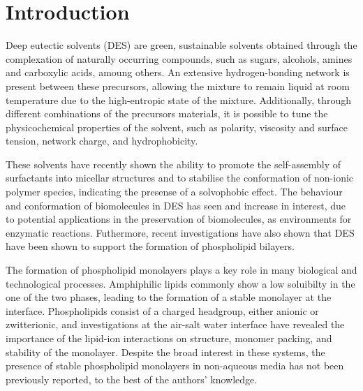 \documentclass[twoside,twocolumn,9pt]{article}
\begin{document}

\section{Introduction}
Deep eutectic solvents (DES) are green, sustainable solvents obtained through the complexation of naturally occurring compounds, such as sugars, alcohols, amines and carboxylic acids, amoung others.\cite{Smith2014, Dai2013} An extensive hydrogen-bonding network is present between these precursors, allowing the mixture to remain liquid at room temperature due to the high-entropic state of the mixture.\cite{Hammond2016, Hammond2017, Araujo2017} Additionally, through different combinations of the precursors materials, it is possible to tune the physicochemical properties of the solvent, such as polarity,\cite{Pandey2014} viscosity and surface tension,\cite{Smith2014} network charge,\cite{Zahn2016} and hydrophobicity.\cite{Ribeiro2015,vanOsch2015} 

These solvents have recently shown the ability to promote the self-assembly of surfactants into micellar structures\cite{Sanchez-Fernandez2016,Arnold2015} and to stabilise the conformation of non-ionic polymer species,\cite{Sapir2016} indicating the presense of a solvophobic effect. The behaviour and conformation of biomolecules in DES has seen and increase in interest,\cite{Esquembre2013,Gorke2010,Gorke2008,Monhami2014,Wu2014,Harifi-Mood2017,Milano2017,Sanchez-Fernandez2017} due to potential applications in the preservation of biomolecules, as environments for enzymatic reactions.\cite{Merza2018} Futhermore, recent investigations have also shown that DES have been shown to support the formation of phospholipid bilayers.\cite{Bryant2017,Bryant2016,Gutierrez2009} 

The formation of phospholipid monolayers plays a key role in many biological and technological processes. Amphiphilic lipids commonly show a low soluibilty in the one of the two phases, leading to the formation of a stable monolayer at the interface.\cite{Mohwald1990} Phospholipids consist of a charged headgroup, either anionic or zwitterionic, and investigations at the air-salt water interface have revealed the importance of the lipid-ion interactions on structure, monomer packing, and stability of the monolayer.\cite{Mohwald1990,Kewalramani2010} Despite the broad interest in these systems, the presence of stable phospholipid monolayers in non-aqueous media has not been previously reported, to the best of the authors' knowledge. 
\end{document}
